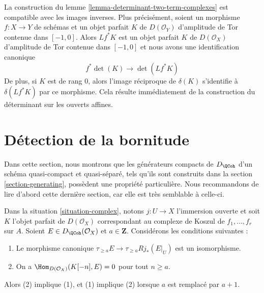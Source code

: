 \begin{remark}
\label{remark-functorial-det}
La construction du lemme \ref{lemma-determinant-two-term-complexes}
est compatible avec les images inverses. Plus précisément, soient un morphisme
$f : X \to Y$ de schémas et un objet parfait $K$ de $D(\mathcal{O}_Y)$
d'amplitude de Tor contenue dans $[-1, 0]$. Alors $Lf^*K$ est un
objet parfait $K$ de $D(\mathcal{O}_X)$
d'amplitude de Tor contenue dans $[-1, 0]$ et nous avons une identification canonique
$$
f^*\det(K) \longrightarrow \det(Lf^*K)
$$
De plus, si $K$ est de rang $0$, alors l'image réciproque de $\delta(K)$ s'identifie à
$\delta(Lf^*K)$ par ce morphisme. Cela résulte immédiatement de la construction
du déterminant sur les ouverts affines.
\end{remark}




\section{Détection de la bornitude}
\label{section-detecting-boundedness}

\noindent
Dans cette section, nous montrons que les générateurs compacts de $D_\QCoh$ d'un
schéma quasi-compact et quasi-séparé, tels qu'ils sont construits dans la
section \ref{section-generating}, possèdent une propriété particulière.
Nous recommandons de lire d'abord cette dernière section, car elle est très semblable à celle-ci.

\begin{lemma}
\label{lemma-orthogonal-koszul-first-variant}
Dans la situation \ref{situation-complex}, notons $j : U \to X$ l'immersion
ouverte et soit $K$ l'objet parfait de $D(\mathcal{O}_X)$
correspondant au complexe de Koszul de $f_1, \ldots, f_r$ sur $A$.
Soient $E \in D_\QCoh(\mathcal{O}_X)$ et $a \in \mathbf{Z}$.
Considérons les conditions suivantes :
\begin{enumerate}
\item Le morphisme canonique $\tau_{\geq a}E \to \tau_{\geq a} Rj_*(E|_U)$
est un isomorphisme.
\item On a $\Hom_{D(\mathcal{O}_X)}(K[-n], E) = 0$ pour tout $n \geq a$.
\end{enumerate}
Alors (2) implique (1), et (1) implique (2) lorsque $a$ est remplacé par $a + 1$.
\end{lemma}

